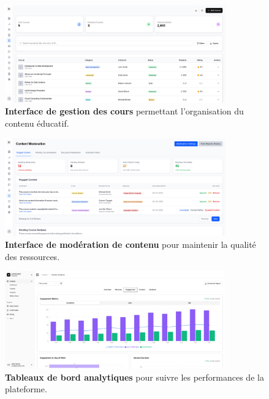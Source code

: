 \begin{figure}[H]
  \centering
  \includegraphics[width=0.85\textwidth,keepaspectratio]{old-reports/week_4_img/coursmanagement.jpeg}
  \caption{\textbf{Interface de gestion des cours} permettant l'organisation du contenu éducatif.}
  \label{fig:course_management}
\end{figure}

\begin{figure}[H]
  \centering
  \includegraphics[width=0.85\textwidth,keepaspectratio]{old-reports/week_4_img/contentmod.jpeg}
  \caption{\textbf{Interface de modération de contenu} pour maintenir la qualité des ressources.}
  \label{fig:content_moderation}
\end{figure}

\begin{figure}[H]
  \centering
  \includegraphics[width=0.85\textwidth,keepaspectratio]{old-reports/week_4_img/analytics.jpeg}
  \caption{\textbf{Tableaux de bord analytiques} pour suivre les performances de la plateforme.}
  \label{fig:analytics_dashboard}
\end{figure}

